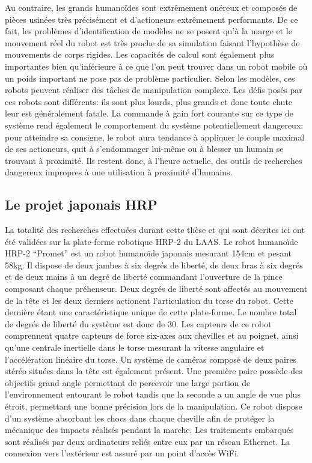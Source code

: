 Au contraire, les grands humanoïdes sont extrêmement onéreux et
composés de pièces usinées très précisément et d'actioneurs
extrêmement performants. De ce fait, les problèmes d'identification de
modèles ne se posent qu'à la marge et le mouvement réel du robot est
très proche de sa simulation faisant l'hypothèse de mouvements de
corps rigides. Les capacités de calcul sont également plus importantes
bien qu'inférieure à ce que l'on peut trouver dans un robot mobile où
un poids important ne pose pas de problème particulier. Selon les
modèles, ces robots peuvent réaliser des tâches de manipulation
complexe. Les défis posés par ces robots sont différents: ils sont
plus lourds, plus grands et donc toute chute leur est généralement
fatale. La commande à gain fort courante sur ce type de système rend
également le comportement du système potentiellement dangereux: pour
atteindre sa consigne, le robot aura tendance à appliquer le couple
maximal de ses actioneurs, quit à s'endommager lui-même ou à blesser
un humain se trouvant à proximité. Ils restent donc, à l'heure
actuelle, des outils de recherches dangereux impropres à une
utilisation à proximité d'humains.


\subsection{Le projet japonais HRP}

La totalité des recherches effectuées durant cette thèse et qui sont
décrites ici ont été validées sur la plate-forme robotique HRP-2
\citep{1307969} du LAAS. Le robot humanoïde HRP-2 ``Promet'' est un
robot humanoïde japonais mesurant 154cm et pesant 58kg. Il dispose de
deux jambes à six degrés de liberté, de deux bras à six degrés et de
deux mains à un degré de liberté commandant l'ouverture de la pince
composant chaque préhenseur. Deux degrés de liberté sont affectés au
mouvement de la tête et les deux derniers actionent l'articulation du
torse du robot. Cette dernière étant une caractéristique unique de
cette plate-forme. Le nombre total de degrés de liberté du système est
donc de 30. Les capteurs de ce robot comprennent quatre capteurs de
force six-axes aux chevilles et au poignet, ainsi qu'une centrale
inertielle dans le torse mesurant la vitesse angulaire et
l'accélération linéaire du torse. Un système de caméras composé de
deux paires stéréo situées dans la tête est également présent. Une
première paire possède des objectifs grand angle permettant de
percevoir une large portion de l'environnement entourant le robot
tandis que la seconde a un angle de vue plus étroit, permettant une
bonne précision lors de la manipulation. Ce robot dispose d'un système
absorbant les chocs dans chaque cheville afin de protéger la mécanique
des impacts réalisés pendant la marche. Les traitements embarqués sont
réalisés par deux ordinateurs reliés entre eux par un réseau
Ethernet. La connexion vers l'extérieur est assuré par un point
d'accès WiFi.



